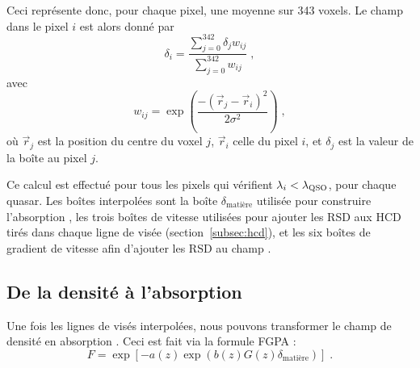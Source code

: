 Ceci représente donc, pour chaque pixel, une moyenne sur \num{343} voxels.
Le champ dans le pixel $i$ est alors donné par
\begin{equation}
  \delta_i = \frac{
    \sum\limits_{j=0}^{342} \delta_j w_{ij}
  }{
    \sum\limits_{j=0}^{342} w_{ij}
  } \; ,
\end{equation}
avec
\begin{equation}
  w_{ij} = \exp(\frac{
    -(\vec r_j - \vec r_i)^2
  }{
    2 \sigma^2
  }) \; ,
\end{equation}
où $\vec r_j$ est la position du centre du voxel $j$, $\vec r_i$ celle du pixel $i$, et  $\delta_j$ est la valeur de la boîte au pixel $j$.

Ce calcul est effectué pour tous les pixels qui vérifient $\lambda_i < \lambda_{\textsc{QSO}}$, pour chaque quasar. Les boîtes interpolées sont la boîte $\delta_{\mathrm{matière}}$ utilisée pour construire l'absorption \lya{}, les trois boîtes de vitesse utilisées pour ajouter les RSD aux HCD tirés dans chaque ligne de visée (section~\ref{subsec:hcd}), et les six boîtes de gradient de vitesse afin d'ajouter les RSD au champ \lya{}.


\subsection{De la densité à l'absorption}
\label{subsec:density2absorption}
Une fois les lignes de visés interpolées, nous pouvons transformer le champ de densité en absorption \lya{}. Ceci est fait via la formule FGPA :
\begin{equation}
  \label{eq:fgpa2}
  F = \exp\left[ - a(z) \exp(b(z) G(z) \delta_{\mathrm{matière}})\right] \;.  
\end{equation}

